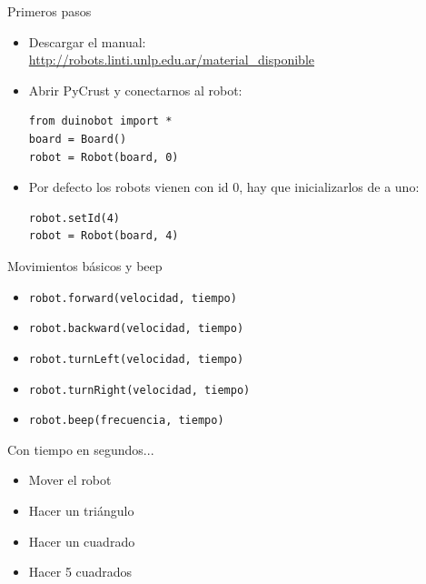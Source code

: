 \documentclass{beamer}[10]
\begin{document}
\begin{frame}[fragile]{Primeros pasos}
	\begin{itemize}[<+->]
		\item Descargar el manual:\\
		{\footnotesize
		\url{http://robots.linti.unlp.edu.ar/material\_disponible}}
		\item Abrir PyCrust y conectarnos al robot:
\begin{block}{}
\begin{lstlisting}
from duinobot import *
board = Board()
robot = Robot(board, 0)
\end{lstlisting}
\end{block}
		\item Por defecto los robots vienen con id 0, hay que inicializarlos de a uno:
\begin{block}{}
\begin{lstlisting}
robot.setId(4)
robot = Robot(board, 4)
\end{lstlisting}
\end{block}
	\end{itemize}
\end{frame}
\begin{frame}[fragile]{Movimientos básicos y beep}
	\begin{itemize}
		\item \verb+robot.forward(velocidad, tiempo)+
		\item \verb+robot.backward(velocidad, tiempo)+
		\item \verb+robot.turnLeft(velocidad, tiempo)+
		\item \verb+robot.turnRight(velocidad, tiempo)+
		\item \verb+robot.beep(frecuencia, tiempo)+
	\end{itemize}
	Con tiempo en segundos...
	\begin{itemize}[<+->]
		\item Mover el robot
		\item Hacer un triángulo
		\item Hacer un cuadrado
		\item Hacer 5 cuadrados
	\end{itemize}
\end{frame}
\end{document}
